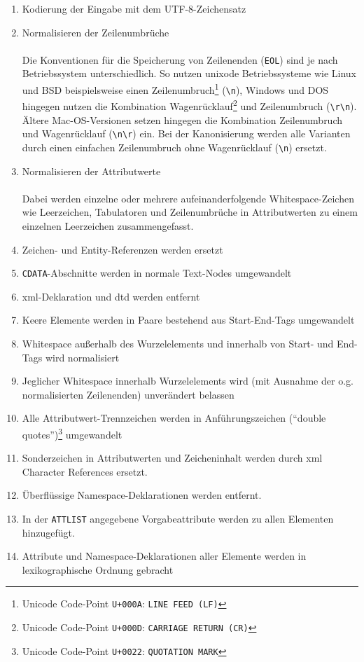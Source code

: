 \begin{enumerate}
    \item{} {Kodierung der Eingabe mit dem UTF-8-Zeichensatz}
    \item{} {Normalisieren der Zeilenumbrüche}\\\\
        Die Konventionen für die Speicherung von Zeilenenden (\texttt{EOL})
        sind je nach Betriebssystem unterschiedlich. So nutzen unixode
        Betriebssysteme wie Linux und BSD beispielsweise einen
        Zeilenumbruch\footnote{Unicode Code-Point \texttt{U+000A}:
        \texttt{LINE FEED (LF)}} (\texttt{{\textbackslash}n}), Windows und DOS hingegen
        nutzen die Kombination Wagenrücklauf\footnote{Unicode Code-Point
        \texttt{U+000D}: \texttt{CARRIAGE RETURN (CR)}} und Zeilenumbruch
        (\texttt{{\textbackslash}r{\textbackslash}n}). Ältere Mac-OS-Versionen setzen hingegen die
        Kombination Zeilenumbruch und Wagenrücklauf (\texttt{{\textbackslash}n{\textbackslash}r})
        ein.\cite[S.~212]{unicode9}
        Bei der Kanonisierung werden alle Varianten durch einen einfachen
        Zeilenumbruch ohne Wagenrücklauf (\texttt{{\textbackslash}n}) ersetzt.
    \item{} {Normalisieren der Attributwerte}\\\\
        Dabei werden einzelne oder mehrere aufeinanderfolgende Whitespace-Zeichen wie Leerzeichen, Tabulatoren und Zeilenumbrüche in Attributwerten zu einem einzelnen Leerzeichen zusammengefasst.
    \item{} {Zeichen- und Entity-Referenzen werden ersetzt}
    \item{} \texttt{CDATA}-Abschnitte werden in normale Text-Nodes umgewandelt
    \item{} \acrshort{xml}-Deklaration und \gls{dtd} werden entfernt
    \item{} Keere Elemente werden in Paare bestehend aus Start-End-Tags umgewandelt
    \item{} Whitespace außerhalb des Wurzelelements und innerhalb von Start- und End-Tags wird normalisiert
    \item{} Jeglicher Whitespace innerhalb Wurzelelements wird (mit Ausnahme der o.g. normalisierten Zeilenenden) unverändert belassen
    \item{} Alle Attributwert-Trennzeichen werden in Anführungszeichen (\enquote{double quotes})\footnote{Unicode Code-Point \texttt{U+0022}: \texttt{QUOTATION MARK}} umgewandelt
    \item{} Sonderzeichen in Attributwerten und Zeicheninhalt werden durch \acrshort{xml} Character References ersetzt.
    \item{} Überflüssige Namespace-Deklarationen werden entfernt.
    \item{} In der \texttt{ATTLIST} angegebene Vorgabeattribute werden zu allen Elementen hinzugefügt.
    \item{} Attribute und Namespace-Deklarationen aller Elemente werden in lexikographische Ordnung gebracht
\end{enumerate}

